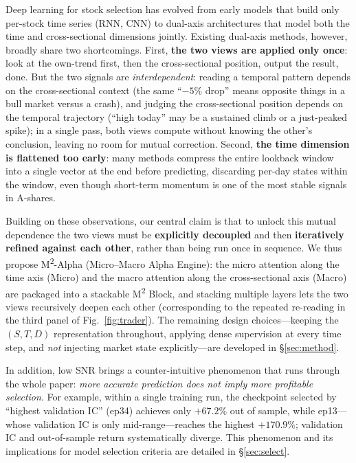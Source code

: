 \documentclass[a4paper,11pt]{article}
\newcommand{\msq}{\texorpdfstring{M\textsuperscript{2}}{M2}}             %
\newcommand{\msqa}{\texorpdfstring{M\textsuperscript{2}-Alpha}{M2-Alpha}} %
\begin{document}
Deep learning for stock selection has evolved from early models that build only
per-stock time series (RNN, CNN) to dual-axis architectures that model both the
time and cross-sectional dimensions jointly. Existing dual-axis methods,
however, broadly share two shortcomings. First, \textbf{the two views are
applied only once}: look at the own-trend first, then the cross-sectional
position, output the result, done. But the two signals are \emph{interdependent}:
reading a temporal pattern depends on the cross-sectional context (the same
``$-5\%$ drop'' means opposite things in a bull market versus a crash), and
judging the cross-sectional position depends on the temporal trajectory
(``high today'' may be a sustained climb or a just-peaked spike); in a single
pass, both views compute without knowing the other's conclusion, leaving no
room for mutual correction. Second, \textbf{the time dimension is flattened
too early}: many methods compress the entire lookback window into a single
vector at the end before predicting, discarding per-day states within the
window, even though short-term momentum is one of the most stable signals in
A-shares.

Building on these observations, our central claim is that to unlock this
mutual dependence the two views must be \textbf{explicitly decoupled} and then
\textbf{iteratively refined against each other}, rather than being run once in
sequence. We thus propose \msqa{} (Micro--Macro Alpha Engine): the micro
attention along the time axis (Micro) and the macro attention along the
cross-sectional axis (Macro) are packaged into a stackable \msq{} Block, and
stacking multiple layers lets the two views recursively deepen each other
(corresponding to the repeated re-reading in the third panel of
Fig.~\ref{fig:trader}). The remaining design choices---keeping the $(S,T,D)$
representation throughout, applying dense supervision at every time step, and
\emph{not} injecting market state explicitly---are developed in
\S\ref{sec:method}.

In addition, low SNR brings a counter-intuitive phenomenon that runs through
the whole paper: \emph{more accurate prediction does not imply more profitable
selection}. For example, within a single training run, the checkpoint selected
by ``highest validation IC'' (ep34) achieves only $+67.2\%$ out of sample,
while ep13---whose validation IC is only mid-range---reaches the highest
$+170.9\%$; validation IC and out-of-sample return systematically diverge. This
phenomenon and its implications for model selection criteria are detailed in
\S\ref{sec:select}.
\end{document}
